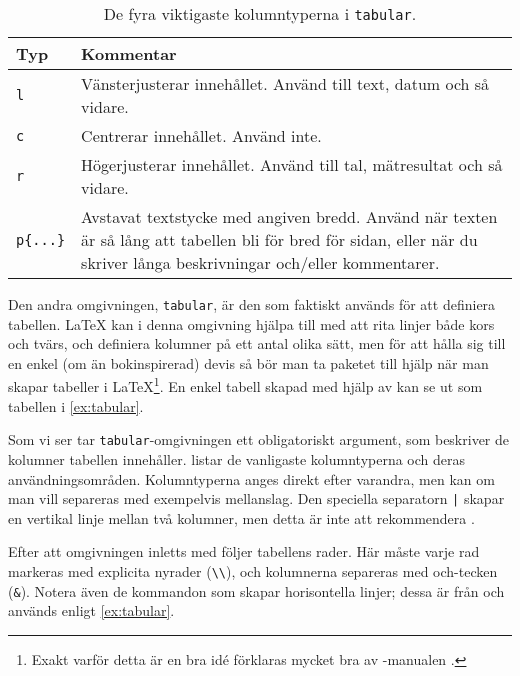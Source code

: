 \documentclass[10pt,../../a4.tex]{subfiles}
\begin{document}
\begin{table}[tb!]
	\centering 
	\caption{De fyra viktigaste kolumntyperna i \texttt{tabular}.}
	\label{tab:kolumner}
	\begin{tabular}{l p{}}
		\toprule 
		Typ & Kommentar \\
		\midrule 
		\texttt{l} & Vänsterjusterar innehållet. Använd till text, datum
					 och så vidare. \\
		\texttt{c} & Centrerar innehållet. Använd inte. \\
		\texttt{r} & Högerjusterar innehållet. Använd till tal, 
				     mätresultat och så vidare. \\
		\texttt{p\{...\}} & Avstavat textstycke med angiven bredd. Använd
							när texten är så lång att tabellen bli för
							bred för sidan, eller när du skriver långa
							beskrivningar och/eller kommentarer. \\
		\bottomrule 
	\end{tabular}
\end{table}

Den andra omgivningen, \texttt{tabular}, är den som faktiskt används för
att definiera tabellen. \LaTeX{} kan i denna omgivning hjälpa till med att
rita linjer både kors och tvärs, och definiera kolumner på ett antal olika
sätt, men för att hålla sig till en enkel (om än bokinspirerad) devis så
bör man ta paketet  till hjälp när man skapar tabeller i
\LaTeX\footnote{Exakt varför detta är en bra idé förklaras mycket bra av
-manualen \parencite{Fear05}.}.
En enkel tabell skapad med hjälp av  kan se ut som
tabellen i \cref{ex:tabular}.

Som vi ser tar \texttt{tabular}-omgivningen ett obligatoriskt argument,
som beskriver de kolumner tabellen innehåller. 
listar de vanligaste kolumntyperna och deras användningsområden.
Kolumntyperna anges direkt efter varandra, men kan om man vill separeras
med exempelvis mellanslag. Den speciella separatorn \texttt{|} skapar en
vertikal linje mellan två kolumner, men detta är inte att rekommendera
\parencite{Fear05}.

Efter att omgivningen inletts med  följer tabellens rader. Här
måste varje rad markeras med explicita nyrader (\verb|\\|), och kolumnerna
separeras med och-tecken (\verb|&|). Notera även de kommandon som skapar
horisontella linjer; dessa är från  och används enligt
\cref{ex:tabular}.
\end{document}
